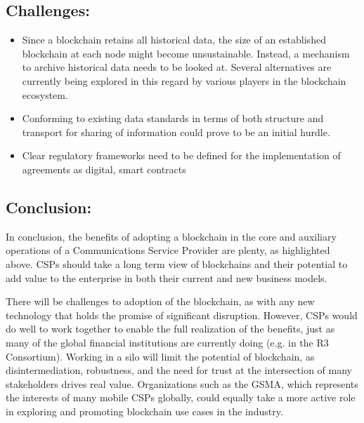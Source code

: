 \documentclass[12pt]{article}
\begin{document}
\subsection{Challenges:}
\begin{itemize}
	\item Since a blockchain retains all historical
	data, the size of an established blockchain
	at each node might become
	unsustainable. Instead, a mechanism
	to archive historical data needs to
	be looked at. Several alternatives are
	currently being explored in this regard
	by various players in the blockchain
	ecosystem.
	\item Conforming to existing data standards
	in terms of both structure and transport
	for sharing of information could
	prove to be an initial hurdle.
	\item Clear regulatory frameworks need to
	be defined for the implementation of
	agreements as digital, smart contracts
\end{itemize}
\subsection{Conclusion:}
In conclusion, the benefits of adopting
a blockchain in the core and auxiliary
operations of a Communications Service
Provider are plenty, as highlighted above.
CSPs should take a long term view of
blockchains and their potential to add value
to the enterprise in both their current and
new business models.

There will be challenges to adoption of the
blockchain, as with any new technology
that holds the promise of significant
disruption. However, CSPs would do well to
work together to enable the full realization
of the benefits, just as many of the global
financial institutions are currently doing
(e.g. in the R3 Consortium). Working in a
silo will limit the potential of blockchain,
as disintermediation, robustness, and
the need for trust at the intersection
of many stakeholders drives real value.
Organizations such as the GSMA, which
represents the interests of many mobile
CSPs globally, could equally take a more
active role in exploring and promoting
blockchain use cases in the industry.
\end{document}
